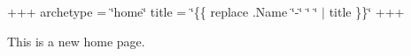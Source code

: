 +++ archetype = \char`\"{}home\char`\"{} title = \char`\"{}\{\{ replace .\+Name \char`\"{}-\/\char`\"{} \char`\"{} \char`\"{} $\vert$ title \}\}\char`\"{} +++

This is a new home page. 